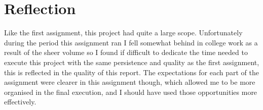 \documentclass{article}
\begin{document}
\section{Reflection}
Like the first assignment, this project had quite a large scope. Unfortunately during the period this assignment ran I fell somewhat behind in college work as a result of the sheer volume so I found if difficult to dedicate the time needed to execute this project with the same persistence and quality as the first assignment, this is reflected in the quality of this report. The expectations for each part of the assignment were clearer in this assignment though, which allowed me to be more organised in the final execution, and I should have used those opportunities more effectively. 




\end{document}
